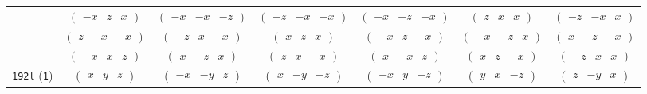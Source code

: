 \documentclass[fleqn,9pt,landscape]{jsarticle}
\begin{document}
\begin{center}
\begin{longtable}{ccccccc}
& $ \begin{pmatrix} - x & z & x \end{pmatrix} $ & $ \begin{pmatrix} - x & - x & - z \end{pmatrix} $ & $ \begin{pmatrix} - z & - x & - x \end{pmatrix} $ & $ \begin{pmatrix} - x & - z & - x \end{pmatrix} $ & $ \begin{pmatrix} z & x & x \end{pmatrix} $ & $ \begin{pmatrix} - z & - x & x \end{pmatrix} $ \\
& $ \begin{pmatrix} z & - x & - x \end{pmatrix} $ & $ \begin{pmatrix} - z & x & - x \end{pmatrix} $ & $ \begin{pmatrix} x & z & x \end{pmatrix} $ & $ \begin{pmatrix} - x & z & - x \end{pmatrix} $ & $ \begin{pmatrix} - x & - z & x \end{pmatrix} $ & $ \begin{pmatrix} x & - z & - x \end{pmatrix} $ \\
& $ \begin{pmatrix} - x & x & z \end{pmatrix} $ & $ \begin{pmatrix} x & - z & x \end{pmatrix} $ & $ \begin{pmatrix} z & x & - x \end{pmatrix} $ & $ \begin{pmatrix} x & - x & z \end{pmatrix} $ & $ \begin{pmatrix} x & z & - x \end{pmatrix} $ & $ \begin{pmatrix} - z & x & x \end{pmatrix} $ \\ \hline
{\tt 192l} ({\tt 1}) & $ \begin{pmatrix} x & y & z \end{pmatrix} $ & $ \begin{pmatrix} - x & - y & z \end{pmatrix} $ & $ \begin{pmatrix} x & - y & - z \end{pmatrix} $ & $ \begin{pmatrix} - x & y & - z \end{pmatrix} $ & $ \begin{pmatrix} y & x & - z \end{pmatrix} $ & $ \begin{pmatrix} z & - y & x \end{pmatrix} $ \\

\end{longtable}
\end{center}
\end{document}
